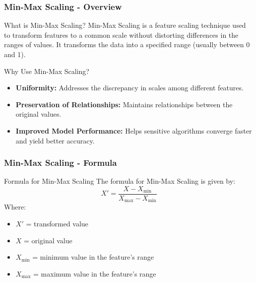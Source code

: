 \documentclass[aspectratio=169]{beamer}
\begin{document}
\begin{frame}[fragile]
    \frametitle{Min-Max Scaling - Overview}
    \begin{block}{What is Min-Max Scaling?}
        Min-Max Scaling is a feature scaling technique used to transform features to a common scale without distorting differences in the ranges of values. It transforms the data into a specified range (usually between 0 and 1).
    \end{block}
    
    \begin{block}{Why Use Min-Max Scaling?}
        \begin{itemize}
            \item \textbf{Uniformity:} Addresses the discrepancy in scales among different features.
            \item \textbf{Preservation of Relationships:} Maintains relationships between the original values.
            \item \textbf{Improved Model Performance:} Helps sensitive algorithms converge faster and yield better accuracy.
        \end{itemize}
    \end{block}
\end{frame}

\begin{frame}[fragile]
    \frametitle{Min-Max Scaling - Formula}
    \begin{block}{Formula for Min-Max Scaling}
        The formula for Min-Max Scaling is given by:
        \begin{equation}
            X' = \frac{X - X_{\text{min}}}{X_{\text{max}} - X_{\text{min}}}
        \end{equation}
        Where:
        \begin{itemize}
            \item \( X' \) = transformed value
            \item \( X \) = original value
            \item \( X_{\text{min}} \) = minimum value in the feature's range
            \item \( X_{\text{max}} \) = maximum value in the feature's range
        \end{itemize}
    \end{block}
\end{frame}
\end{document}
